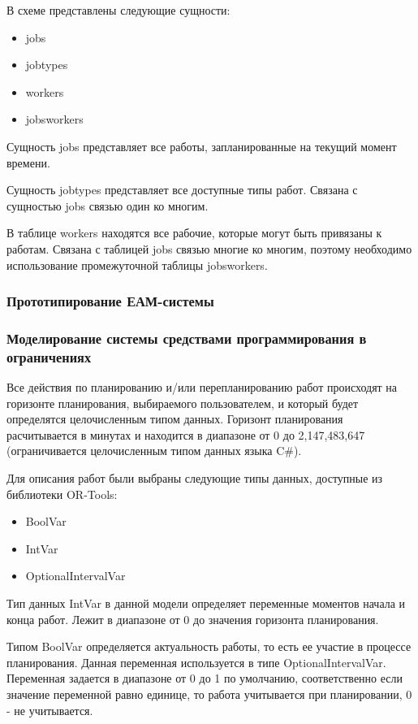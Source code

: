 
В схеме представлены следующие сущности:
\begin{itemize}
	\item jobs
	\item jobtypes
	\item workers
	\item jobsworkers
\end{itemize}

Сущность jobs представляет все работы, запланированные на текущий момент времени.

Сущность jobtypes представляет все доступные типы работ. Связана с сущностью jobs связью один ко многим.

В таблице workers находятся все рабочие, которые могут быть привязаны к работам. Связана с таблицей jobs связью многие ко многим, поэтому необходимо использование промежуточной таблицы jobsworkers.

\subsubsection{Прототипирование ЕАМ-системы}

\subsubsection{Моделирование системы средствами программирования в ограничениях}

Все действия по планированию и/или перепланированию работ происходят на горизонте планирования, выбираемого пользователем, и который будет определятся целочисленным типом данных. Горизонт планирования расчитывается в минутах и находится в диапазоне от 0 до 2,147,483,647 (ограничивается целочисленным типом данных языка C\#).

Для описания работ были выбраны следующие типы данных, доступные из библиотеки OR-Tools:
\begin{itemize}
	\item BoolVar
	\item IntVar
	\item OptionalIntervalVar
\end{itemize}

Тип данных IntVar в данной модели определяет переменные моментов начала и конца работ. Лежит в диапазоне от 0 до значения горизонта планирования.

Типом BoolVar определяется актуальность работы, то есть ее участие в процессе планирования. Данная переменная используется в типе OptionalIntervalVar. Переменная задается в диапазоне от 0 до 1 по умолчанию, соответственно если значение переменной равно единице, то работа учитывается при планировании, 0 - не учитывается.

